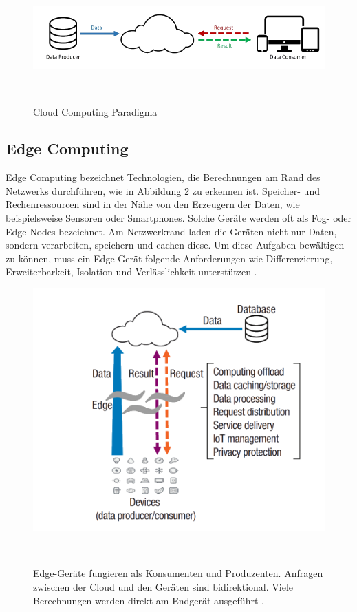 \documentclass{sigchi}
\begin{document}
\begin{figure}
\centering
  \includegraphics[width=0.65\columnwidth]{figures/cloud-computing-structure.PNG}
  \caption{Cloud Computing Paradigma \cite{vision-challenges:2016}}~\label{fig:cloud-computing}
\end{figure}

\subsection{Edge Computing}
Edge Computing bezeichnet Technologien, die Berechnungen am Rand des Netzwerks durchführen, wie in Abbildung \ref{fig:edge-computing} zu erkennen ist. Speicher- und Rechenressourcen sind in der Nähe von den Erzeugern der Daten, wie beispielsweise Sensoren oder Smartphones. Solche Geräte werden oft als Fog- oder Edge-Nodes bezeichnet. Am Netzwerkrand laden die Geräten nicht nur Daten, sondern verarbeiten, speichern und cachen diese. Um diese Aufgaben bewältigen zu können, muss ein Edge-Gerät folgende Anforderungen wie Differenzierung, Erweiterbarkeit, Isolation und Verlässlichkeit unterstützen \cite{promise-edge-computing:2016}.

\begin{figure}
\centering
  \includegraphics[width=0.65\columnwidth]{figures/edge-computing-structure.PNG}
  \caption{Edge-Geräte fungieren als Konsumenten und Produzenten. Anfragen zwischen der Cloud und den Geräten sind bidirektional. Viele Berechnungen werden direkt am Endgerät ausgeführt \cite{promise-edge-computing:2016}.}~\label{fig:edge-computing}
\end{figure}
\end{document}
